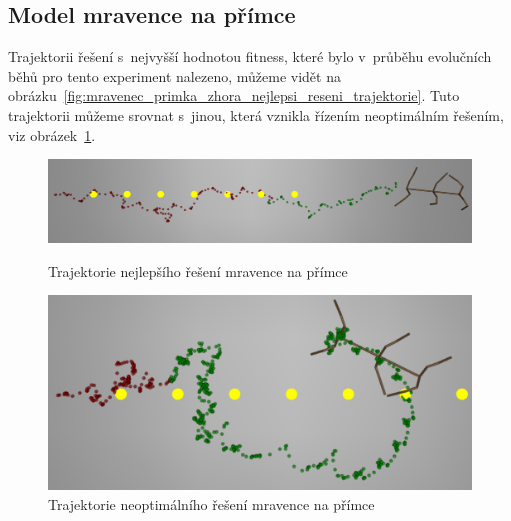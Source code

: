 \clearpage


\subsection{Model mravence na přímce}
Trajektorii řešení s~nejvyšší hodnotou fitness, které bylo v~průběhu evolučních běhů pro tento experiment nalezeno, můžeme vidět na obrázku~\ref{fig:mravenec_primka_zhora_nejlepsi_reseni_trajektorie}.
Tuto trajektorii můžeme srovnat s~jinou, která vznikla řízením neoptimálním řešením, viz obrázek~\ref{fig:mravenec_primka_zhora_neoptimalni_reseni_trajektorie}.



\begin{figure}[h]
    \begin{minipage}[c]{0.48\linewidth}
        \includegraphics[width=\linewidth]{obrazky/mravenec_primka_zhora_nejlepsi_reseni_trajektorie.png}
        \caption{Trajektorie nejlepšího řešení mravence na přímce}
        \label{fig:mravenec_primka_zhora_nejlepsi_reseni_trajektorie}
    \end{minipage}
    \hfill
    \begin{minipage}[c]{0.48\linewidth}
        \includegraphics[width=\linewidth]{obrazky/mravenec_zhora_neoptimalni_reseni_trajektorie.png}
        \caption{Trajektorie neoptimálního řešení mravence na přímce}
        \label{fig:mravenec_primka_zhora_neoptimalni_reseni_trajektorie}
    \end{minipage}
\end{figure}

